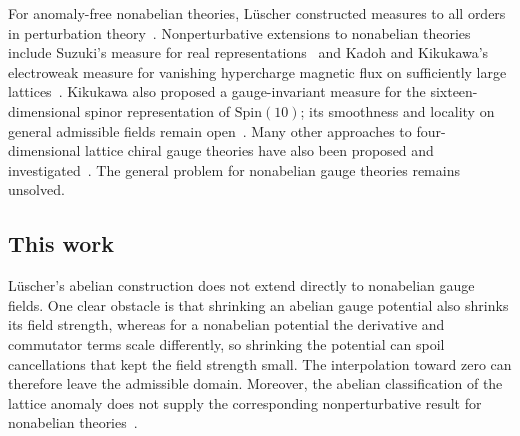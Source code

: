 \documentclass[11pt,a4paper]{article}
\theoremstyle{remark}
\begin{document}
For anomaly-free nonabelian theories, L\"uscher constructed measures to all orders in perturbation theory~\cite{LuscherPerturbative}. Nonperturbative extensions to nonabelian theories include Suzuki's measure for real representations~\cite{SuzukiReal} and Kadoh and Kikukawa's electroweak measure for vanishing hypercharge magnetic flux on sufficiently large lattices~\cite{KadohKikukawaEW,KadohKikukawaErratum}. Kikukawa also proposed a gauge-invariant measure for the sixteen-dimensional spinor representation of $\mathrm{Spin}(10)$; its smoothness and locality on general admissible fields remain open~\cite{KikukawaSpinTen}. Many other approaches to four-dimensional lattice chiral gauge theories have also been proposed and investigated~\cite{Swift1984,Smit1986,EichtenPreskill1986,Montvay1987,CreutzTytgatRebbiXue1997,Xue1997,BorrelliEtAl1990,Vink1994,Shamir1998Phase,GoltermanShamir1997,BockGoltermanShamir1998,GoltermanShamir2004,Smit1992Staggered,BockSmitVink1994,AlonsoEtAl1992,DrellWeinsteinYankielowicz1976,QuinnWeinstein1986,Rebbi1987,BietenholzWiese1996,FrolovSlavnov1994,Slavnov1995,GockelerSchierholz1992,tHooft1995,Hsu1995,Kronfeld1995,HernandezSundrumChiral,Bodwin1996,Kaplan1992,Shamir1993,GoltermanJansenPetcherVink1994,Kikukawa2002,GrabowskaKaplan2016Regulator,GrabowskaKaplan2016Chiral,FukayaEtAl2017,Kaplan2024,KaplanSen2026,BhattacharyaMartinPoppitz2006,PoppitzShang2007,Wen2013,YouBenTovXu2014,YouXu2015,WangWen2020,Catterall2021,Catterall2024,ThorngrenPreskillFidkowski2026,Zenkin1993,AoyamaKikukawa2019,PedersenKikukawa2023,GoltermanPetcher1989,GoltermanPetcherRivas1993,BockGoltermanShamir1998Perturbation,BockGoltermanLeungShamir2000,GoltermanShamir2003,FurmanShamir1995,GockelerKronfeldSchierholzWiese,Kronfeld1996,GoltermanJansenKaplan1993,KaplanSchmaltz1996,KaplanSen2024,ClancyKaplan2025}. The general problem for nonabelian gauge theories remains unsolved.

\subsection{This work}

L\"uscher's abelian construction does not extend directly to nonabelian gauge fields. One clear obstacle is that shrinking an abelian gauge potential also shrinks its field strength, whereas for a nonabelian potential the derivative and commutator terms scale differently, so shrinking the potential can spoil cancellations that kept the field strength small. The interpolation toward zero can therefore leave the admissible domain. Moreover, the abelian classification of the lattice anomaly does not supply the corresponding nonperturbative result for nonabelian theories~\cite{LuscherNonabelian}.
\end{document}
